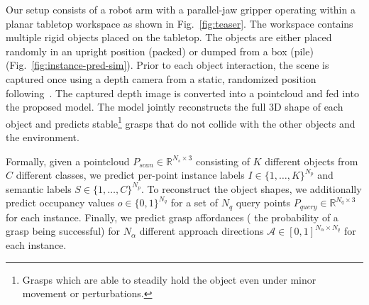 \documentclass[letterpaper, 10 pt, conference]{ieeeconf}  %
\begin{document}
\vspace{-2px}
Our setup consists of a robot arm with a parallel-jaw gripper operating within a planar tabletop workspace as shown in Fig.~\ref{fig:teaser}.
The workspace contains multiple rigid objects placed on the tabletop. The objects are either placed randomly in an upright position (packed) or dumped from a box (pile) (Fig.~\ref{fig:instance-pred-sim}).
Prior to each object interaction, the scene is captured once using a depth camera from a static, randomized position following~\cite{huang2022edge}.
The captured depth image is converted into a pointcloud and fed into the proposed model. The model jointly reconstructs the full 3D shape of each object and predicts stable\footnote{Grasps which are able to steadily hold the object even under minor movement or perturbations.} grasps that do not collide with the other objects and the environment.

Formally, given a pointcloud $P_{scan}\in \mathbb{R}^{N_s\times3}$ consisting of $K$ different objects from $C$ different classes,
we predict per-point instance labels $I \in \{1,\dots,K\}^{N_p}$ and semantic labels $S \in  \{1,\dots,C\}^{N_p}$.
To reconstruct the object shapes, we additionally predict occupancy values $o \in \{0,1\}^{N_q}$ for a set of $N_q$ query points $P_{query} \in \mathbb{R}^{N_q\times 3}$ for each instance. Finally, we predict grasp affordances (\ie{} the probability of a grasp being successful) for $N_\alpha$ different approach directions $\mathcal{A} \in [0,1]^{N_{\alpha} \times N_q}$ for each instance.
\end{document}
